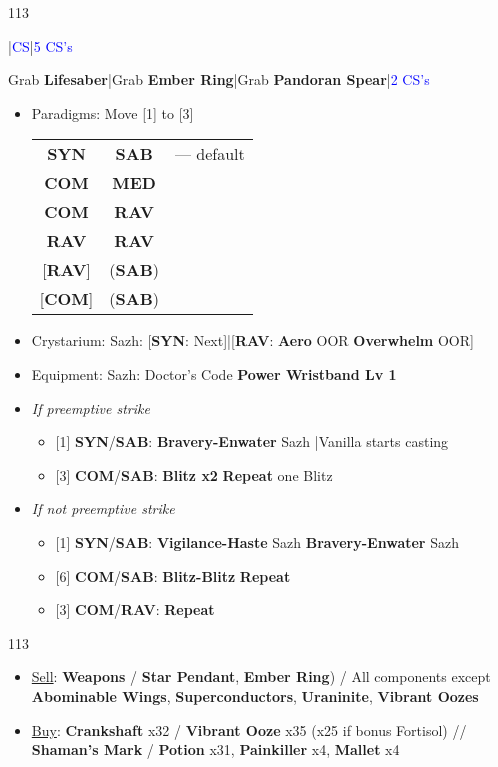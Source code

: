\documentclass[a4paper, fontsize=11pt, DIV=26, parskip=full]{scrartcl}
\let\olditem\item
\renewcommand{\item}{%
	\olditem\vspace{-5pt}}
\newenvironment{fight}[1]{
	\begin{tcolorbox}[enhanced, fonttitle={\bfseries}, title=#1]
		\begin{itemize}[leftmargin=*]
	}{\end{itemize}\end{tcolorbox}}
\newenvironment{menu}{
	\begin{tcolorbox}[enhanced, colframe=yellow!50!red,	colbacktitle=yellow!50!red, coltitle=red!25!black, title=\textbf{Menu}]
		\begin{itemize}[leftmargin=*]
	}{\end{itemize}\end{tcolorbox}}
\newenvironment{shop}[1]{
	\begin{tcolorbox}[enhanced, colframe=red!75!black, title=\textbf{Shop \ding{220} \textit{#1}}]
		\begin{itemize}[leftmargin=*]
		}{\end{itemize}\end{tcolorbox}}
\newenvironment{mainlist}{\begin{dinglist}{113}}{\end{dinglist}}
\newcommand{\role}[2]{\textbf{#2#1}}
\newcommand{\com}{\role{COM}{\color{red}}}
\newcommand{\rav}{\role{RAV}{\color{blue}}}
\newcommand{\med}{\role{MED}{\color{green}}}
\newcommand{\syn}{\role{SYN}{\color[rgb]{0.58,0,0.83}}}
\newcommand{\sab}{\role{SAB}{\color{gray}}}
\renewcommand{\skip}{{\textcolor{blue}{CS}}}
\newcommand{\skips}[1]{{\textcolor{blue}{#1 CS's}}}
\renewcommand{\to}{ \ding{219} }
\begin{document}
	\begin{mainlist}
		\item \skip|\skip|\skips{5}
		\item Grab \textbf{Lifesaber}|Grab \textbf{Ember Ring}|Grab \textbf{Pandoran Spear}|\skips{2}
	\end{mainlist}
	\begin{menu}
		\item Paradigms: Move [1] to [3]
		\begin{tabular}{ccl}
			\syn       & \sab   & --- default \\
			\com       & \med   &             \\
			\com       & \rav   &             \\
			\rav       & \rav   &             \\
			{[}\rav{]} & (\sab) &             \\
			{[}\com{]} & (\sab) &            
		\end{tabular}
		\item Crystarium: Sazh: [\syn: Next]|[\rav: \textbf{Aero} OOR\to \textbf{Overwhelm} OOR]
		\item Equipment: Sazh: Doctor's Code \to \textbf{Power Wristband Lv 1}
	\end{menu}
	\begin{fight}{Flanborg \& Flanitor (Preempt)}
		\item \textit{If preemptive strike}
		\begin{itemize}
			\item [1] \syn/\sab: \textbf{Bravery-Enwater} Sazh |Vanilla starts casting
			\item [3] \com/\sab: \textbf{Blitz x2}\to \textbf{Repeat} one Blitz
		\end{itemize}
		\item \textit{If not preemptive strike}
		\begin{itemize}
			\item [1] \syn/\sab: \textbf{Vigilance-Haste} Sazh\to \textbf{Bravery-Enwater} Sazh
			\item [6] \com/\sab: \textbf{Blitz-Blitz}\to \textbf{Repeat}
			\item [3] \com/\rav: \textbf{Repeat}
		\end{itemize}
	\end{fight}
	\begin{mainlist}
		\item \skips{2}
	\end{mainlist}
	\begin{shop}{Lenora's Garage}
		\item \underline{Sell}: \textbf{Weapons} / \textbf{Star Pendant}, \textbf{Ember Ring}) / All components except \textbf{Abominable Wings}, \textbf{Superconductors}, \textbf{Uraninite}, \textbf{Vibrant Oozes}
		\item \underline{Buy}: \textbf{Crankshaft} x32 / \textbf{Vibrant Ooze} x35 (x25 if bonus Fortisol) // \textbf{Shaman's Mark} / \textbf{Potion} x31, \textbf{Painkiller} x4, \textbf{Mallet} x4
	\end{shop}
\end{document}
